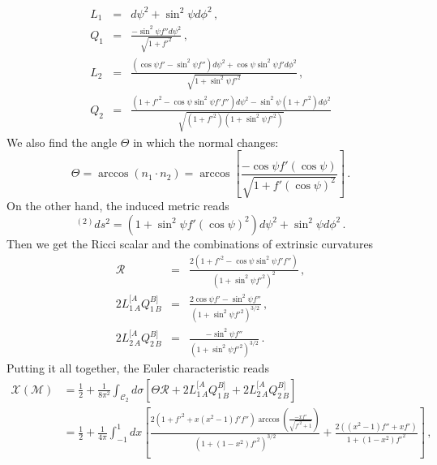 \documentclass[11pt,letterpaper]{article}
\begin{document}
\begin{eqnarray}
L_1&=&d\psi^2+\sin^2\psi d\phi^2\, ,\\
Q_1&=&\frac{-\sin^2\psi f'' d\psi^2}{\sqrt{1+f'^2}}\, ,\\
L_2&=&\frac{\left(\cos\psi f'-\sin^2\psi f''\right)d\psi^2+\cos\psi\sin^2\psi f'd\phi^2}{\sqrt{1+\sin^2\psi f'^2}}\, ,\\
Q_2&=&\frac{\left(1+f'^2-\cos\psi\sin^2\psi f'f''\right)d\psi^2-\sin^2\psi\left(1+f'^2\right)d\phi^2}{\sqrt{(1+f'^2)(1+\sin^2\psi f'^2)}}
\end{eqnarray}
We also find the angle $\Theta$ in which the normal changes:
\begin{equation}
\Theta=\arccos(n_1\cdot n_2)=\arccos\left[\frac{-\cos\psi f'(\cos\psi)}{\sqrt{1+f'(\cos\psi)^2}}\right]\, .
\end{equation}
On the other hand, the induced metric reads
\begin{equation}
^{(2)}ds^2=\left(1+\sin^2\psi f'(\cos\psi)^2\right)d\psi^2+\sin^2\psi d\phi^2\, .
\end{equation}
Then we get the Ricci scalar and the combinations of extrinsic curvatures
\begin{eqnarray}
\mathcal{R}&=&\frac{2\left(1+f'^2-\cos\psi\sin^2\psi f'f''\right)}{(1+\sin^2\psi f'^2)^2}\, ,\\
2L^{[A}_{1\, A}Q^{B]}_{1\, B}&=&\frac{2\cos\psi f'-\sin^2\psi f''}{(1+\sin^2\psi f'^2)^{3/2}}\, ,\\
2L^{[A}_{2\, A}Q^{B]}_{2\, B}&=&\frac{-\sin^2\psi f''}{(1+\sin^2\psi f'^2)^{3/2}}\, .
\end{eqnarray}
Putting it all together, the Euler characteristic reads
\begin{equation}
\begin{aligned}
\mathcal{X}(\mathcal{M})&=\frac{1}{2}+\frac{1}{8\pi^2}\int_{\mathcal{C}_2}d\sigma \left[\Theta\hat{\mathcal{R}}+2L^{[A}_{1\, A}Q^{B]}_{1\, B}+2L^{[A}_{2\, A}Q^{B]}_{2\, B}\right]\\
&=\frac{1}{2}+\frac{1}{4\pi}\int_{-1}^{1}dx\left[\frac{2 \left(1+f'^2+x \left(x^2-1\right) f' f''\right) \arccos \left(\frac{-x f'}{\sqrt{f'^2+1}}\right)}{\left(1+\left(1-x^2\right) f'^2\right)^{3/2}}+\frac{2 \left(\left(x^2-1\right) f''+x f'\right)}{1+\left(1-x^2\right) f'^2}\right]\, ,
\end{aligned}
\end{equation}
\end{document}
